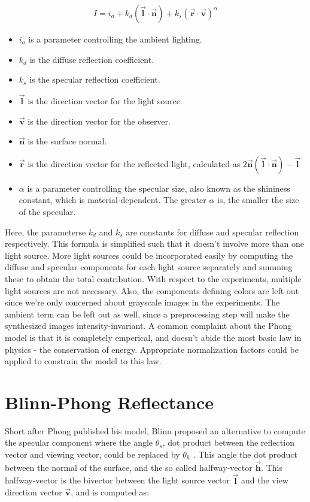 	\begin{eqnarray*}
		I = i_a + k_d(\vec{\mathbf{l}} \cdot \vec{\mathbf{n}}) + k_s(\vec{\mathbf{r}} \cdot \vec{\mathbf{v}})^\alpha
	\end{eqnarray*}

\begin{itemize}
	\item[] $i_a$ is a parameter controlling the ambient lighting.
	\item[] $k_d$ is the diffuse reflection coefficient.
	\item[] $k_s$ is the specular reflection coefficient.
	\item[] $\vec{\mathbf{l}}$ is the direction vector for the light source.
	\item[] $\vec{\mathbf{v}}$ is the direction vector for the observer.
	\item[] $\vec{\mathbf{n}}$ is the surface normal.
	\item[] $\vec{\mathbf{r}}$ is the direction vector for the reflected light, 
		calculated as $2\vec{\mathbf{n}}(\vec{\mathbf{l}} \cdot \vec{\mathbf{n}}) - \vec{\mathbf{l}}$
	\item[] $\alpha$ is a parameter controlling the specular size, also known as the shininess constant, which is material-dependent. The greater $\alpha$ is, the smaller the size of the specular.
\end{itemize}

Here, the parameterse $k_d$ and $k_s$ are constants for diffuse and specular reflection respectively. 
This formula is simplified such that it doesn't involve more than one light source. More light sources could be incorporated easily by computing the diffuse and specular components for each light source separately and summing these to obtain the total contribution. With respect to the experiments, multiple light sources are not necessary. Also, the components defining colors are left out since we're only concerned about grayscale images in the experiments. The ambient term can be left out as well, since a preprocessing step will make the synthesized images intensity-invariant. A common complaint about the Phong model is that it is completely emperical, and doesn't abide the most basic law in physics - the conservation of energy. Appropriate normalization factors could be applied to constrain the model to this law.

	\section{Blinn-Phong Reflectance}\label{sec:BlinnPhong}
		Short after Phong published his model, Blinn proposed an alternative to compute the specular component where the angle $\theta_s$, dot product between the reflection vector and viewing vector, could be replaced by $\theta_h$ \cite{Blinn}. This angle the dot product between the normal of the surface, and the so called halfway-vector $\vec{\mathbf{h}}$. This halfway-vector is the bivector between the light source vector $\vec{\mathbf{l}}$ and the view direction vector $\vec{\mathbf{v}}$, and is computed as:

